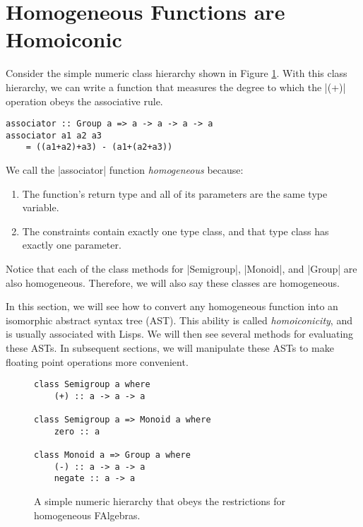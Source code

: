 \documentclass[preprint]{sigplanconf}
\theoremstyle{definition}
\begin{document}
\section{Homogeneous Functions are Homoiconic}
Consider the simple numeric class hierarchy shown in Figure \ref{code:group}.
With this class hierarchy, we can write a function that measures the degree to which the |(+)| operation obeys the associative rule.
\begin{lstlisting}
associator :: Group a => a -> a -> a -> a
associator a1 a2 a3
    = ((a1+a2)+a3) - (a1+(a2+a3))
\end{lstlisting}
We call the |associator| function \emph{homogeneous} because:
\begin{enumerate}
\item
The function's return type and all of its parameters are the same type variable.
\item
The constraints contain exactly one type class, and
that type class has exactly one parameter.
\end{enumerate}
Notice that each of the class methods for |Semigroup|, |Monoid|, and |Group| are also homogeneous.
Therefore, we will also say these classes are homogeneous.

In this section, we will see how to convert any homogeneous function into an isomorphic abstract syntax tree (AST).
This ability is called \emph{homoiconicity},
and is usually associated with Lisps.
We will then see several methods for evaluating these ASTs.
In subsequent sections, we will manipulate these ASTs to make floating point operations more convenient.

\begin{figure}
\begin{lstlisting}
class Semigroup a where
    (+) :: a -> a -> a

class Semigroup a => Monoid a where
    zero :: a

class Monoid a => Group a where
    (-) :: a -> a -> a
    negate :: a -> a
\end{lstlisting}
\caption{A simple numeric hierarchy that obeys the restrictions for homogeneous FAlgebras.}
\label{code:group}
\end{figure}
\end{document}
